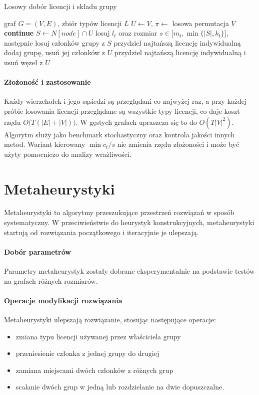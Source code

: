 \begin{algorithm}[H]
  \caption{Losowy dobór licencji i składu grupy}\label{alg:randomized}
  \begin{algorithmic}[1]
    \Require graf $G=(V,E)$, zbiór typów licencji $L$
    \State $U\gets V$, $\pi\gets$ losowa permutacja $V$
     \textbf{continue} \EndIf
    \State $S\gets N[node]\cap U$
    \State losuj $l_t$ oraz rozmiar $s\in\bigl[m_t,\min\{|S|,k_t\}\bigr]$, następnie losuj członków grupy z $S$
    \Else
    \State przydziel najtańszą licencję indywidualną
    \EndIf
    \State dodaj grupę, usuń jej członków z $U$
    \EndFor
     przydziel najtańszą licencję indywidualną i usuń węzeł z $U$ \EndWhile
  \end{algorithmic}
\end{algorithm}

\paragraph{Złożoność i zastosowanie}
Każdy wierzchołek i jego sąsiedzi są przeglądani co najwyżej raz, a przy każdej próbie losowania licencji przeglądane są wszystkie typy licencji, co daje koszt rzędu \(O\bigl(T(|E|+|V|)\bigr)\).
W gęstych grafach upraszcza się to do \(O(T|V|^2)\).
Algorytm służy jako benchmark stochastyczny oraz kontrola jakości innych metod.
Wariant kierowany \(\min c_t/s\) nie zmienia rzędu złożoności i może być użyty pomocniczo do analizy wrażliwości.


\section{Metaheurystyki}

Metaheurystyki to algorytmy przeszukujące przestrzeń rozwiązań w sposób systematyczny. W przeciwieństwie do heurystyk konstrukcyjnych, metaheurystyki startują od rozwiązania początkowego i iteracyjnie je ulepszają.

\paragraph{Dobór parametrów}
Parametry metaheurystyk zostały dobrane eksperymentalnie na podstawie testów na grafach różnych rozmiarów.

\paragraph{Operacje modyfikacji rozwiązania}
Metaheurystyki ulepszają rozwiązanie, stosując następujące operacje:
\begin{itemize}
  \item zmiana typu licencji używanej przez właściciela grupy
  \item przeniesienie członka z jednej grupy do drugiej
  \item zamiana miejscami dwóch członków z różnych grup
  \item scalanie dwóch grup w jedną lub rozdzielanie na dwie dopuszczalne.
\end{itemize}

